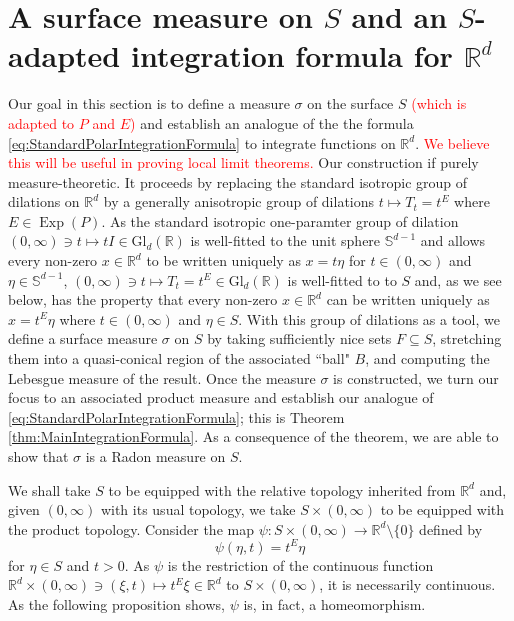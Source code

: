 \documentclass[11pt]{article}
\theoremstyle{theorem}
\newcommand\GldR{\mbox{Gl}_d(\mathbb{R})}
\newcommand\Exp{\operatorname{Exp}}
\begin{document}
\section{A surface measure on $S$ and an $S$-adapted integration formula for $\mathbb{R}^d$}\label{sec:IntegrationFormula}

Our goal in this section is to define a measure $\sigma$ on the surface $S$ \textcolor{red}{(which is adapted to $P$ and $E$)} and establish an analogue of the the formula \eqref{eq:StandardPolarIntegrationFormula} to integrate functions on $\mathbb{R}^d$. \textcolor{red}{We believe this will be useful in proving local limit theorems.} Our construction if purely measure-theoretic. It proceeds by replacing the standard isotropic group of dilations on $\mathbb{R}^d$ by a generally anisotropic group of dilations $t\mapsto T_t=t^E$ where $E\in\Exp(P)$. As the standard isotropic one-paramter group of dilation $(0,\infty)\ni t\mapsto tI\in \GldR$ is well-fitted to the unit sphere $\mathbb{S}^{d-1}$ and allows every non-zero $x\in\mathbb{R}^d$ to be written uniquely as $x=t\eta$ for $t\in (0,\infty)$ and $\eta\in \mathbb{S}^{d-1}$, $(0,\infty)\ni t\mapsto T_t=t^E\in\GldR$ is well-fitted to to $S$ and, as we see below, has the property that every non-zero $x\in\mathbb{R}^d$ can be written uniquely as $x=t^E\eta$ where $t\in(0,\infty)$ and $\eta\in S$. With this group of dilations as a tool, we define a surface measure $\sigma$ on $S$ by taking sufficiently nice sets $F\subseteq S$, stretching them into a quasi-conical region of the associated ``ball" $B$, and computing the Lebesgue measure of the result. Once the measure $\sigma$ is constructed, we turn our focus to an associated product measure and establish our analogue of \eqref{eq:StandardPolarIntegrationFormula}; this is Theorem \ref{thm:MainIntegrationFormula}. As a consequence of the theorem, we are able to show that $\sigma$ is a Radon measure on $S$. 

We shall take $S$ to be equipped with the relative topology inherited from $\mathbb{R}^d$ and, given $(0,\infty)$ with its usual topology, we take $S\times (0,\infty)$ to be equipped with the product topology. Consider the map $\psi:S\times (0,\infty)\to\mathbb{R}^d\setminus\{0\}$ defined by
\begin{equation}\label{eq:Homeomorphism}
\psi(\eta,t)=t^E\eta
\end{equation}
for $\eta\in S$ and $t>0$. As $\psi$ is the restriction of the continuous function $\mathbb{R}^d\times (0,\infty)\ni (\xi,t)\mapsto t^E\xi\in\mathbb{R}^d$ to $S\times (0,\infty)$, it is necessarily continuous. As the following proposition shows, $\psi$ is, in fact, a homeomorphism.
\end{document}
